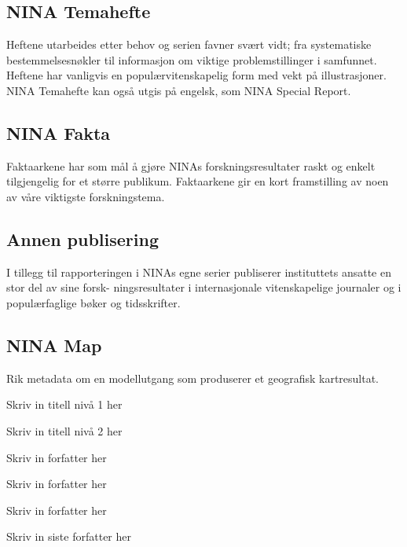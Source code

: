 \documentclass[11pt, a4paper]{article}
\begin{document}
\subsection*{\small{NINA Temahefte}}
{\normalsize Heftene utarbeides etter behov og serien favner svært vidt; fra systematiske bestemmelsesnøkler til informasjon om viktige problemstillinger i samfunnet. Heftene har vanligvis en populærvitenskapelig form med vekt på illustrasjoner. NINA Temahefte kan også utgis på engelsk, som NINA Special Report.}

\subsection*{\small{NINA Fakta}}
{\normalsize Faktaarkene har som mål å gjøre NINAs forskningsresultater raskt og enkelt tilgjengelig for et større
publikum. Faktaarkene gir en kort framstilling av noen av våre viktigste forskningstema.}

\subsection*{\small{Annen publisering}}
{\normalsize I tillegg til rapporteringen i NINAs egne serier publiserer instituttets ansatte en stor del av sine forsk- ningsresultater i internasjonale vitenskapelige journaler og i populærfaglige bøker og tidsskrifter.}

\subsection*{\small{NINA Map}}
{\normalsize Rik metadata om en modellutgang som produserer et geografisk kartresultat.}
\clearpage
{}
\setcounter{page}{1}
\vspace{2cm}

\huge{Skriv in titell nivå 1 her} \par\vspace{.5cm}
\LARGE{Skriv in titell nivå 2 her} \par\vspace{1cm}
\hspace{0cm}\LARGE{Skriv in forfatter her} \par
\LARGE{Skriv in forfatter her} \par
\LARGE{Skriv in forfatter her} \par
\LARGE{Skriv in siste forfatter her} \par
\end{document}
